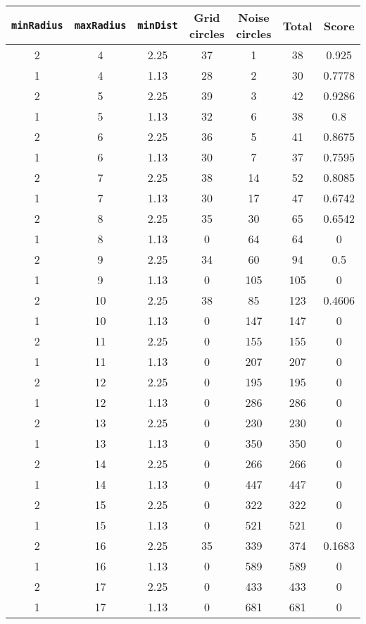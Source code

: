 \documentclass[letterpaper, 12pt]{article}
\begin{document}
\begin{longtable}{|c|c|c|c|c|c|c|}
\hline
\textbf{\texttt{minRadius}} & \textbf{\texttt{maxRadius}} & \textbf{\texttt{minDist}} & \textbf{Grid circles} & \textbf{Noise circles} & \textbf{Total} & \textbf{Score} \\
\hline
2 & 4 & 2.25 & 37 & 1 & 38 & 0.925 \\
\hline
1 & 4 & 1.13 & 28 & 2 & 30 & 0.7778 \\
\hline
2 & 5 & 2.25 & 39 & 3 & 42 & 0.9286 \\
\hline
1 & 5 & 1.13 & 32 & 6 & 38 & 0.8 \\
\hline
2 & 6 & 2.25 & 36 & 5 & 41 & 0.8675 \\
\hline
1 & 6 & 1.13 & 30 & 7 & 37 & 0.7595 \\
\hline
2 & 7 & 2.25 & 38 & 14 & 52 & 0.8085 \\
\hline
1 & 7 & 1.13 & 30 & 17 & 47 & 0.6742 \\
\hline
2 & 8 & 2.25 & 35 & 30 & 65 & 0.6542 \\
\hline
1 & 8 & 1.13 & 0 & 64 & 64 & 0 \\
\hline
2 & 9 & 2.25 & 34 & 60 & 94 & 0.5 \\
\hline
1 & 9 & 1.13 & 0 & 105 & 105 & 0 \\
\hline
2 & 10 & 2.25 & 38 & 85 & 123 & 0.4606 \\
\hline
1 & 10 & 1.13 & 0 & 147 & 147 & 0 \\
\hline
2 & 11 & 2.25 & 0 & 155 & 155 & 0 \\
\hline
1 & 11 & 1.13 & 0 & 207 & 207 & 0 \\
\hline
2 & 12 & 2.25 & 0 & 195 & 195 & 0 \\
\hline
1 & 12 & 1.13 & 0 & 286 & 286 & 0 \\
\hline
2 & 13 & 2.25 & 0 & 230 & 230 & 0 \\
\hline
1 & 13 & 1.13 & 0 & 350 & 350 & 0 \\
\hline
2 & 14 & 2.25 & 0 & 266 & 266 & 0 \\
\hline
1 & 14 & 1.13 & 0 & 447 & 447 & 0 \\
\hline
2 & 15 & 2.25 & 0 & 322 & 322 & 0 \\
\hline
1 & 15 & 1.13 & 0 & 521 & 521 & 0 \\
\hline
2 & 16 & 2.25 & 35 & 339 & 374 & 0.1683 \\
\hline
1 & 16 & 1.13 & 0 & 589 & 589 & 0 \\
\hline
2 & 17 & 2.25 & 0 & 433 & 433 & 0 \\
\hline
1 & 17 & 1.13 & 0 & 681 & 681 & 0 \\

\end{longtable}
\end{document}
